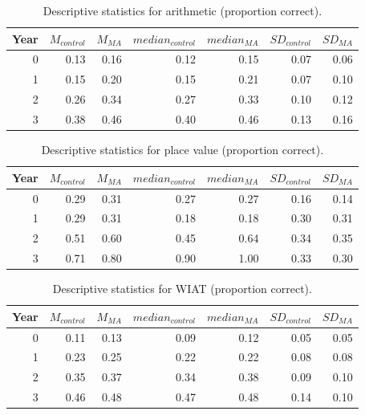 \documentclass[11pt]{article}
\begin{document}
\begin{table}[H]
\centering
\begin{tabular}{rrrrrrr}
  \hline
Year & $M_{control}$ & $M_{MA}$ & $median_{control}$ & $median_{MA}$ & $SD_{control}$ & $SD_{MA}$ \\ 
  \hline
  0 & 0.13 & 0.16 & 0.12 & 0.15 & 0.07 & 0.06 \\ 
    1 & 0.15 & 0.20 & 0.15 & 0.21 & 0.07 & 0.10 \\ 
    2 & 0.26 & 0.34 & 0.27 & 0.33 & 0.10 & 0.12 \\ 
    3 & 0.38 & 0.46 & 0.40 & 0.46 & 0.13 & 0.16 \\ 
   \hline
\end{tabular}
\caption{Descriptive statistics for arithmetic (proportion correct).} 
\label{tab:arith}
\end{table}
\begin{table}[H]
\centering
\begin{tabular}{rrrrrrr}
  \hline
Year & $M_{control}$ & $M_{MA}$ & $median_{control}$ & $median_{MA}$ & $SD_{control}$ & $SD_{MA}$ \\ 
  \hline
  0 & 0.29 & 0.31 & 0.27 & 0.27 & 0.16 & 0.14 \\ 
    1 & 0.29 & 0.31 & 0.18 & 0.18 & 0.30 & 0.31 \\ 
    2 & 0.51 & 0.60 & 0.45 & 0.64 & 0.34 & 0.35 \\ 
    3 & 0.71 & 0.80 & 0.90 & 1.00 & 0.33 & 0.30 \\ 
   \hline
\end{tabular}
\caption{Descriptive statistics for place value (proportion correct).} 
\label{tab:placeval}
\end{table}
\begin{table}[H]
\centering
\begin{tabular}{rrrrrrr}
  \hline
Year & $M_{control}$ & $M_{MA}$ & $median_{control}$ & $median_{MA}$ & $SD_{control}$ & $SD_{MA}$ \\ 
  \hline
  0 & 0.11 & 0.13 & 0.09 & 0.12 & 0.05 & 0.05 \\ 
    1 & 0.23 & 0.25 & 0.22 & 0.22 & 0.08 & 0.08 \\ 
    2 & 0.35 & 0.37 & 0.34 & 0.38 & 0.09 & 0.10 \\ 
    3 & 0.46 & 0.48 & 0.47 & 0.48 & 0.14 & 0.10 \\ 
   \hline
\end{tabular}
\caption{Descriptive statistics for WIAT (proportion correct).} 
\label{tab:wiat}
\end{table}
\end{document}
